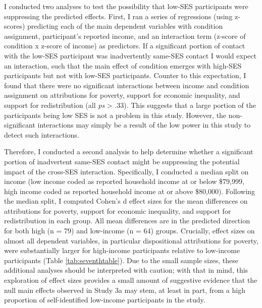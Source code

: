\documentclass{sfuthesis}
\begin{document}
I conducted two analyses to test the possibility that low-SES participants were suppressing the predicted effects. First, I ran a series of regressions (using z-scores) predicting each of the main dependent variables with condition assignment, participant’s reported income, and an interaction term (z-score of condition x z-score of income) as predictors. If a significant portion of contact with the low-SES participant was inadvertently same-SES contact I would expect an interaction, such that the main effect of condition emerges with high-SES participants but not with low-SES participants. Counter to this expectation, I found that there were no significant interactions between income and condition assignment on attributions for poverty, support for economic inequality, and support for redistribution (all \textit{ps} > .33). This suggests that a large portion of the participants being low SES is not a problem in this study. However, the non-significant interactions may simply be a result of the low power in this study to detect such interactions.
	
Therefore, I conducted a second analysis to help determine whether a significant portion of inadvertent same-SES contact might be suppressing the potential impact of the cross-SES interaction. Specifically, I conducted a median split on income (low income coded as reported household income at or below \$79,999, high income coded as reported household income at or above \$80,000). Following the median split, I computed Cohen’s d effect sizes for the mean differences on attributions for poverty, support for economic inequality, and support for redistribution in each group. All mean differences are in the predicted direction for both high (n = 79) and low-income (n = 64) groups. Crucially, effect sizes on almost all dependent variables, in particular dispositional attributions for poverty, were substantially larger for high-income participants relative to low-income participants (Table \ref{tab:seventhtable}). Due to the small sample sizes, these additional analyses should be interpreted with caution; with that in mind, this exploration of effect sizes provides a small amount of suggestive evidence that the null main effects observed in Study 3a may stem, at least in part, from a high proportion of self-identified low-income participants in the study. 
\end{document}
